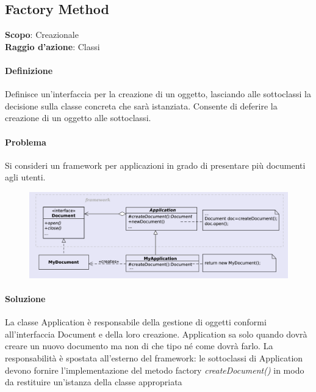 \subsection{Factory Method}

\textbf{Scopo}: Creazionale  \\
\textbf{Raggio d'azione}: Classi

\paragraph{Definizione} Definisce un'interfaccia per la creazione di un oggetto, lasciando alle sottoclassi la decisione sulla classe concreta che sarà istanziata. Consente di deferire la creazione di un oggetto alle sottoclassi.

\paragraph{Problema} Si consideri un framework per applicazioni in grado di presentare più documenti agli utenti.

\begin{figure}[H]
    \centering
    \includegraphics[width=1\linewidth]{assets/pattern/factory-method/factory-method-esempio.png}
\end{figure}

\paragraph{Soluzione} La classe Application è responsabile della gestione di oggetti conformi all’interfaccia Document e della loro creazione. Application sa solo quando dovrà creare un nuovo documento ma non di che tipo né come dovrà farlo. La responsabilità è spostata all’esterno del framework: le sottoclassi di Application devono fornire l’implementazione del metodo factory \textit{createDocument()} in modo da restituire un’istanza della classe appropriata

